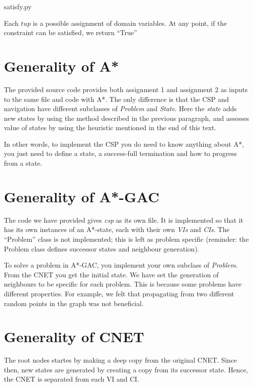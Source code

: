 \documentclass[journal]{IEEEtran}
\begin{document}
\begin{lstinputlisting}[caption="Checking constraint",language=Python]{satisfy.py}
    \label{lst:enforce}
\end{lstinputlisting}

Each $tup$ is a possible assignment of domain variables. At any point, if the
constraint can be satisfied, we return ``True''

\section{Generality of A*}
The provided source code provides both assignment 1 and assignment 2
as inputs to the same file and code with A*. The only difference is that the CSP and navigation
have different subclasses of \textit{Problem} and \textit{State}. Here the \textit{state} adds
new states by using the method described in the previous paragraph, and assesses
value of states by using the heuristic mentioned in the end of this text.

In other words, to implement the CSP you do need to know anything about A*, you
just need to define a state, a success-full termination and how to progress from
a state.

\section{Generality of A*-GAC}
The code we have provided gives \textit{csp} as its own file. 
It is implemented so that it has its own instances of an 
A*-state, each with their own \textit{VIs} and \textit{CIs}.
The ``Problem'' class is not implemented; this is left as problem specific
(reminder: the Problem class defines successor states and neighbour generation).

To solve a problem in A*-GAC, you implement your own subclass of 
\textit{Problem}. From the CNET you get the initial state. We have set
the generation of neighbours to be specific for each problem. This is because
some problems have different properties. For example, we felt that
propagating from two different random points in the graph was not beneficial.

\section{Generality of CNET}
The root nodes startes by making a deep copy from the original CNET.
Since then, new states are generated by creating a copy from its successor state.
Hence, the CNET is separated from each VI and CI. 
\end{document}
